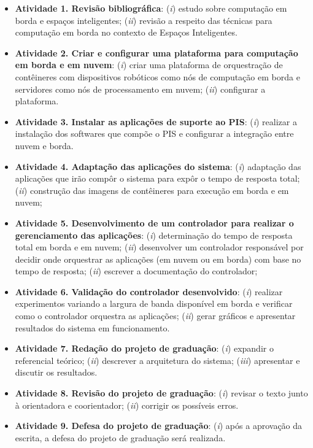\begin{itemize}
\item 
\textbf{Atividade 1. Revisão bibliográfica}:
(\textit{i}) estudo sobre computação em borda e espaços inteligentes;
(\textit{ii}) revisão a respeito das técnicas para computação em borda no contexto de Espaços Inteligentes.

\item 
\textbf{Atividade 2. Criar e configurar uma plataforma para computação em borda e em nuvem}:
(\textit{i}) criar uma plataforma de orquestração de contêineres com dispositivos robóticos como nós de computação em borda e servidores como nós de processamento em nuvem;
(\textit{ii}) configurar a plataforma.

\item 
\textbf{Atividade 3. Instalar as aplicações de suporte ao PIS}:
(\textit{i}) realizar a instalação dos softwares que compõe o PIS e configurar a integração entre nuvem e borda.

\item 
\textbf{Atividade 4. Adaptação das aplicações do sistema}:
(\textit{i}) adaptação das aplicações que irão compôr o sistema para expôr o tempo de resposta total;
(\textit{ii}) construção das imagens de contêineres para execução em borda e em nuvem;

\item 
\textbf{Atividade 5. Desenvolvimento de um controlador para realizar o gerenciamento das aplicações}:
(\textit{i}) determinação do tempo de resposta total em borda e em nuvem;
(\textit{ii}) desenvolver um controlador responsável por decidir onde orquestrar as aplicações (em nuvem ou em borda) com base no tempo de resposta;
(\textit{ii}) escrever a documentação do controlador;

\item 
\textbf{Atividade 6. Validação do controlador desenvolvido}:
(\textit{i}) realizar experimentos variando a largura de banda disponível em borda e verificar como o controlador orquestra as aplicações;
(\textit{ii}) gerar gráficos e apresentar resultados do sistema em funcionamento.

\item 
\textbf{Atividade 7. Redação do projeto de graduação}:
(\textit{i}) expandir o referencial teórico;
(\textit{ii}) descrever a arquitetura do sistema;
(\textit{iii}) apresentar e discutir os resultados.

\item 
\textbf{Atividade 8. Revisão do projeto de graduação}:
(\textit{i}) revisar o texto junto à orientadora e coorientador;
(\textit{ii}) corrigir os possíveis erros.

\item 
\textbf{Atividade 9. Defesa do projeto de graduação}:
(\textit{i}) após a aprovação da escrita, a defesa do projeto de graduação será realizada.

\end{itemize}

